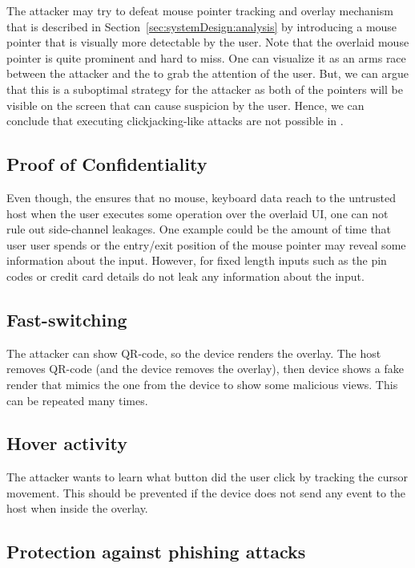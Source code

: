  The attacker may try to defeat \name mouse pointer tracking and overlay mechanism that is described in Section~\ref{sec:systemDesign:analysis} by introducing a mouse pointer that is visually more detectable by the user. Note that the \device overlaid mouse pointer is quite prominent and hard to miss. One can visualize it as an arms race between the attacker and the \device to grab the attention of the user. But, we can argue that this is a suboptimal strategy for the attacker as both of the pointers will be visible on the screen that can cause suspicion by the user. Hence, we can conclude that executing clickjacking-like attacks are not possible in \name.

\subsection{Proof of Confidentiality}

 Even though, the \device ensures that no mouse, keyboard data reach to the untrusted host when the user executes some operation over the overlaid UI, one can not rule out side-channel leakages. One example could be the amount of time that user user spends or the entry/exit position of the mouse pointer may reveal some information about the input. However, for fixed length inputs such as the pin codes or credit card details do not leak any information about the input.

\subsection{Fast-switching}
The attacker can show QR-code, so the device renders the overlay. The host removes QR-code (and the device removes the overlay), then device shows a fake render that mimics the one from the device to show some malicious views. This can be repeated many times.

\subsection{Hover activity}
The attacker wants to learn what button did the user click by tracking the cursor movement. This should be prevented if the device does not send any event to the host when inside the overlay.


\iffalse
\subsection{Protection against phishing attacks}
